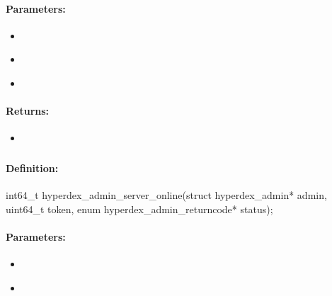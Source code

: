 \paragraph{Parameters:}
\begin{itemize}[noitemsep]
\item {}\\

\item {}\\

\item {}\\

\end{itemize}

\paragraph{Returns:}
\begin{itemize}[noitemsep]
\item {}\\

\end{itemize}

\pagebreak
\subsubsection{}
\label{api:c:server_online}


\paragraph{Definition:}
\begin{ccode}
int64_t hyperdex_admin_server_online(struct hyperdex_admin* admin,
        uint64_t token,
        enum hyperdex_admin_returncode* status);
\end{ccode}

\paragraph{Parameters:}
\begin{itemize}[noitemsep]
\item {}\\

\item {}\\

\end{itemize}

